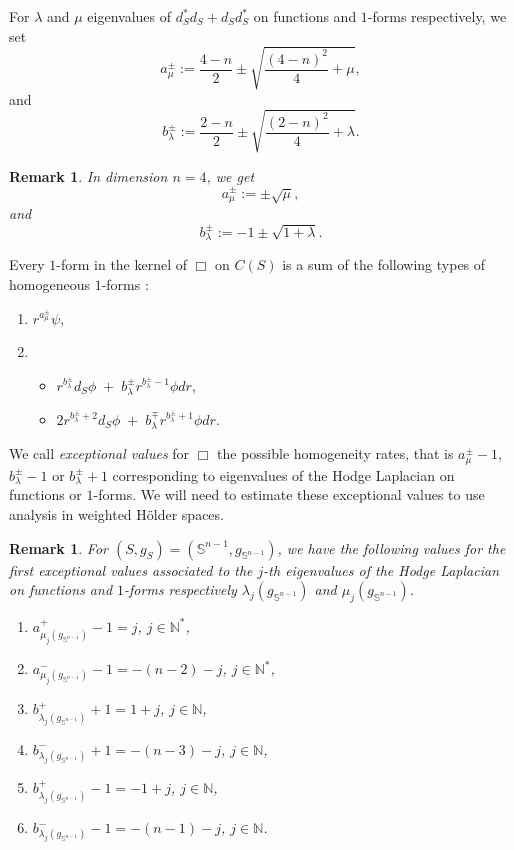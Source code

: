 \documentclass[a4paper,11pt,reqno]{amsart}
\newtheorem{rk}[defn]{Remark}
\numberwithin{equation}{section}
\begin{document}
	For $\lambda$ and $\mu$ eigenvalues of $d^*_Sd_S + d_Sd_S^*$ on functions and $1$-forms respectively, we set
	\begin{equation}
	a_{\mu}^\pm:= \frac{4-n}{2}\pm\sqrt{\frac{(4-n)^2}{4}+\mu},\label{alpha mu}
	\end{equation}
	and
	\begin{equation}
	b_{\lambda}^\pm:=\frac{2-n}{2} \pm\sqrt{\frac{(2-n)^2}{4}+\lambda}.\label{beta lambda}
	\end{equation}
	\begin{rk}
		In dimension $n=4$, we get 
		$$ a_{\mu}^\pm:= \pm\sqrt{\mu}, $$
		and
		$$ b_{\lambda}^\pm:=-1 \pm\sqrt{1+\lambda}.$$
	\end{rk}
	
	Every $1$-form in the kernel of $\Box$ on $C(S)$ is a sum of the following types of homogeneous $1$-forms :
	\begin{enumerate}
		\item $r^{a^\pm_\mu}\psi$,
		\item \begin{itemize}
			\item $r^{b^{\pm}_\lambda}d_S\phi \;+\; b^\pm_\lambda r^{b^\pm_\lambda-1}\phi dr$,
			\item $2r^{b^{\pm}_\lambda+2}d_S\phi \;+\; b^\mp_\lambda r^{b^\pm_\lambda+1}\phi dr$.
		\end{itemize}
	\end{enumerate}
	We call \emph{exceptional values} for $\Box$ the possible homogeneity rates, that is $a^\pm_\mu-1$, $b^\pm_\lambda-1$ or $b^\pm_\lambda+1$ corresponding to eigenvalues of the Hodge Laplacian on functions or $1$-forms. We will need to estimate these exceptional values to use analysis in weighted Hölder spaces.
	
	\begin{rk}\label{rem poids crit sphere}
		For $(S,g_S) = (\mathbb{S}^{n-1},g_{\mathbb{S}^{n-1}})$, we have the following values for the first exceptional values associated to the $j$-th eigenvalues of the Hodge Laplacian on functions and $1$-forms respectively $\lambda_j(g_{\mathbb{S}^{n-1}})$ and $\mu_j(g_{\mathbb{S}^{n-1}})$.
		\begin{enumerate}
			\item $a_{\mu_j(g_{\mathbb{S}^{n-1}})}^+-1 = j$, $j\in \mathbb{N}^*$,
			\item $a_{\mu_j(g_{\mathbb{S}^{n-1}})}^--1 = -(n-2)-j$, $j\in \mathbb{N}^*$,
			\item $b_{\lambda_j(g_{\mathbb{S}^{n-1}})}^++1 =1+j$, $j\in \mathbb{N}$,
			\item $b_{\lambda_j(g_{\mathbb{S}^{n-1}})}^-+1 =-(n-3)-j$, $j\in \mathbb{N}$,
			\item $b_{\lambda_j(g_{\mathbb{S}^{n-1}})}^+-1 =-1+j$, $j\in \mathbb{N}$,
			\item $b_{\lambda_j(g_{\mathbb{S}^{n-1}})}^--1 =-(n-1)-j$, $j\in \mathbb{N}$.
		\end{enumerate}
		
		
	\end{rk}
	
\end{document}
